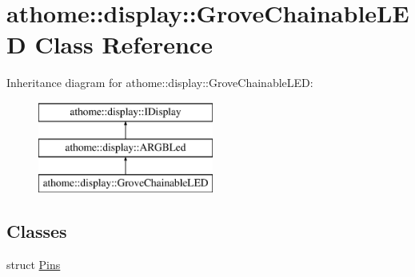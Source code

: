 \hypertarget{classathome_1_1display_1_1_grove_chainable_l_e_d}{}\section{athome\+:\+:display\+:\+:Grove\+Chainable\+L\+ED Class Reference}
\label{classathome_1_1display_1_1_grove_chainable_l_e_d}
Inheritance diagram for athome\+:\+:display\+:\+:Grove\+Chainable\+L\+ED\+:\begin{figure}[H]
\begin{center}
\leavevmode
\includegraphics[height=3.000000cm]{classathome_1_1display_1_1_grove_chainable_l_e_d}
\end{center}
\end{figure}
\subsection*{Classes}
\begin{DoxyCompactItemize}
\item 
struct \mbox{\hyperlink{structathome_1_1display_1_1_grove_chainable_l_e_d_1_1_pins}{Pins}}
\end{DoxyCompactItemize}
